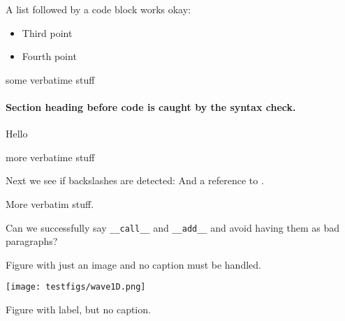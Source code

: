 \documentclass[%
oneside,                 %
final,                   %
10pt]{article}
\newcounter{doconce:movie:counter}
\begin{document}

\newcommand{\exercisesection}[1]{\subsection*{#1}}







A list followed by a code block works okay:

\begin{itemize}
  \item Third point

  \item Fourth point
\end{itemize}

\noindent


\bcod
some verbatime stuff

\ecod


\paragraph{Section heading before code is caught by the syntax check.}
\label{my} 

Hello


\bccq
more verbatime stuff

\eccq


Next we see if backslashes are detected: 
And a reference to \cite{mybook}.



\bccq
More verbatim stuff.

\eccq


Can we successfully say \Verb!__call__! and \Verb!__add__! and avoid having them as
bad paragraphs?

Figure with just an image and no caption must be handled.

\vspace{6mm}

\centerline{\texttt{[image: testfigs/wave1D.png]}}

\vspace{6mm}

Figure with label, but no caption.
\end{document}
